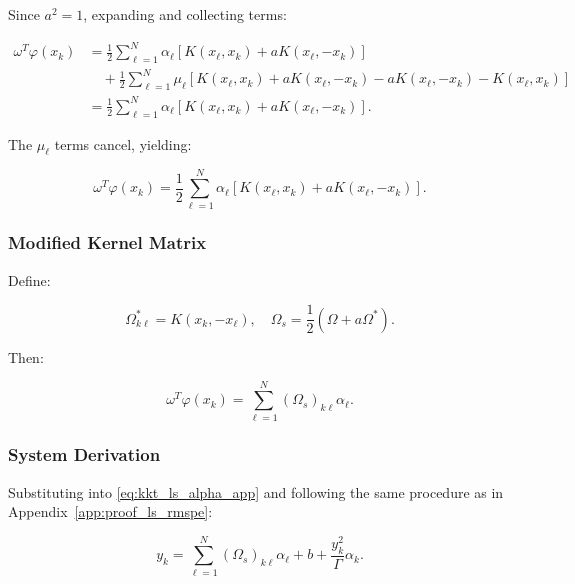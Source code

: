 \documentclass[mathematics,article,submit,pdftex,moreauthors]{Definitions/mdpi}
\begin{document}
Since $a^2 = 1$, expanding and collecting terms:
\begin{linenomath}
\begin{equation}
\begin{aligned}
\omega^T\varphi(x_k) 
&= \frac{1}{2}\sum_{\ell=1}^N \alpha_\ell[K(x_\ell, x_k) + aK(x_\ell, -x_k)]\\
&\quad + \frac{1}{2}\sum_{\ell=1}^N \mu_\ell[K(x_\ell, x_k) + aK(x_\ell, -x_k) - aK(x_\ell, -x_k) - K(x_\ell, x_k)]\\
&= \frac{1}{2}\sum_{\ell=1}^N \alpha_\ell[K(x_\ell, x_k) + aK(x_\ell, -x_k)].
\end{aligned}
\end{equation}
\end{linenomath}

The $\mu_\ell$ terms cancel, yielding:
\begin{linenomath}
\begin{equation}
\omega^T\varphi(x_k) = \frac{1}{2}\sum_{\ell=1}^N \alpha_\ell[K(x_\ell, x_k) + aK(x_\ell, -x_k)].
\end{equation}
\end{linenomath}

\subsubsection{Modified Kernel Matrix}

Define:
\begin{linenomath}
\begin{equation}
\Omega^*_{k\ell} = K(x_k, -x_\ell), \quad \Omega_s = \frac{1}{2}(\Omega + a\Omega^*).
\end{equation}
\end{linenomath}

Then:
\begin{linenomath}
\begin{equation}
\omega^T\varphi(x_k) = \sum_{\ell=1}^N (\Omega_s)_{k\ell} \alpha_\ell.
\end{equation}
\end{linenomath}

\subsubsection{System Derivation}

Substituting into \eqref{eq:kkt_ls_alpha_app} and following the same procedure as 
in Appendix~\ref{app:proof_ls_rmspe}:
\begin{linenomath}
\begin{equation}
y_k = \sum_{\ell=1}^N (\Omega_s)_{k\ell} \alpha_\ell + b + \frac{y_k^2}{\Gamma}\alpha_k.
\end{equation}
\end{linenomath}
\end{document}

